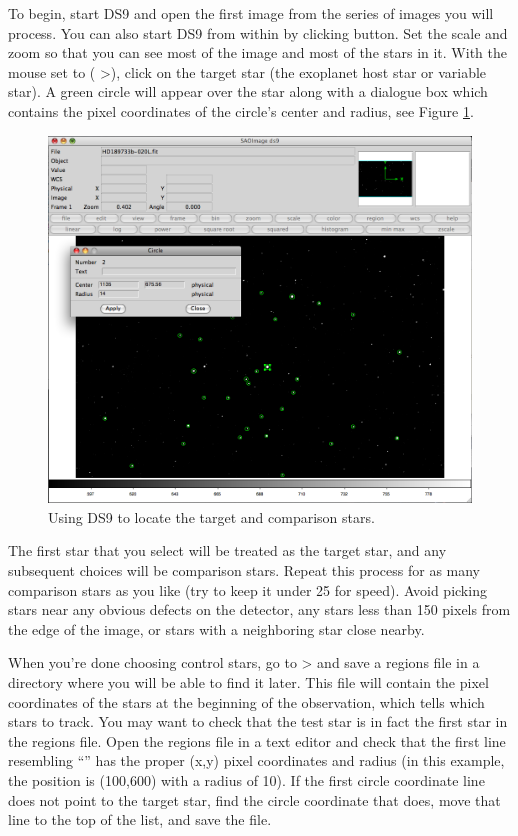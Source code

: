 \documentclass{article}
\begin{document}
To begin, start DS9 and open the first image from the series of images you will process. You can also start DS9 from within \oscaar by clicking  button. Set the scale and zoom so that you can see most of the image and most of the stars in it. With the mouse set to  ( \textgreater  {}), click on the target star (the exoplanet host star or variable star). A green circle will appear over the star along with a dialogue box which contains the pixel coordinates of the circle's center and radius, see Figure \ref{fig:ds9}. 
\begin{figure}[h]
\begin{center}
\includegraphics[scale=0.2]{imgs/ds9.png}
\caption{Using DS9 to locate the target and comparison stars.}
\label{fig:ds9}
\end{center}	
\end{figure}
The first star that you select will be treated as the target star, and any subsequent choices will be comparison stars. Repeat this process for as many comparison stars as you like (try to keep it under 25 for speed). Avoid picking stars near any obvious defects on the detector, any stars less than 150 pixels from the edge of the image, or stars with a neighboring star close nearby. 

When you're done choosing control stars, go to  \textgreater  {} and save a regions file in a directory where you will be able to find it later. This file will contain the pixel coordinates of the stars at the beginning of the observation, which tells \oscaar which stars to track. You may want to check that the test star is in fact the first star in the regions file. Open the regions file in a text editor and check that the first line resembling ``'' has the proper (x,y) pixel coordinates and radius (in this example, the position is (100,600) with a radius of 10). If the first circle coordinate line does not point to the target star, find the circle coordinate that does, move that line to the top of the list, and save the file.
\end{document}
